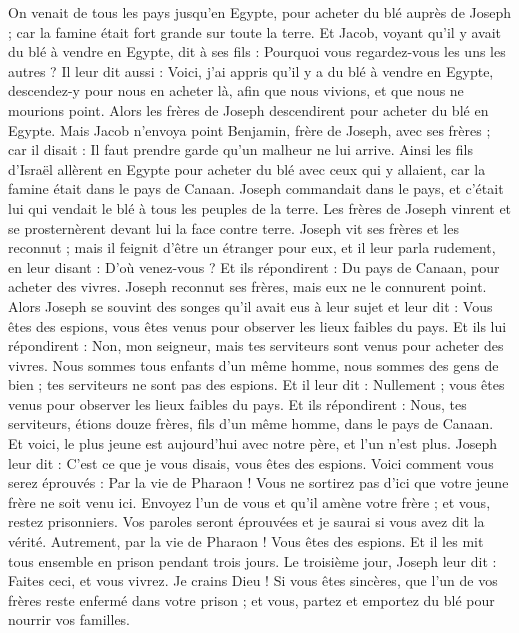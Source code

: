 \begin{multicols}{2}
On venait de tous les pays jusqu’en Egypte, pour acheter du blé  auprès de Joseph ; car la famine était fort grande sur toute la terre.
\VerseOne{}Et Jacob, voyant qu'il y avait du blé à vendre en Egypte, dit à ses fils : Pourquoi vous regardez-vous les uns les autres ?
Il leur dit aussi : Voici, j'ai appris qu'il y a du blé à vendre en Egypte, descendez-y pour nous en acheter là, afin que nous vivions, et que nous ne mourions point.
Alors les frères de Joseph descendirent pour acheter du blé en Egypte.
Mais Jacob n'envoya point Benjamin, frère de Joseph, avec ses frères ; car il disait : Il faut prendre garde qu’un malheur ne lui arrive.
Ainsi les fils d'Israël allèrent en Egypte pour acheter du blé avec ceux qui y allaient, car la famine était dans le pays de Canaan.
Joseph commandait dans le pays, et c’était lui qui vendait le blé à tous les peuples de la terre. Les frères de Joseph vinrent et se prosternèrent devant lui la face contre terre.
Joseph vit ses frères et les reconnut ; mais il feignit d’être un étranger pour eux, et il leur parla rudement, en leur disant : D'où venez-vous ? Et ils répondirent : Du pays de Canaan, pour acheter des vivres.
Joseph reconnut ses frères, mais eux ne le connurent point.
Alors Joseph se souvint des songes qu'il avait eus à leur sujet et leur dit : Vous êtes des espions, vous êtes venus pour observer les lieux faibles du pays.
Et ils lui répondirent : Non, mon seigneur, mais tes serviteurs sont venus pour acheter des vivres.
Nous sommes tous enfants d'un même homme, nous sommes des gens de bien ; tes serviteurs ne sont pas des espions.
Et il leur dit : Nullement ; vous êtes venus pour observer les lieux faibles du pays.
Et ils répondirent : Nous, tes serviteurs, étions douze frères, fils d'un même homme, dans le pays de Canaan. Et voici, le plus jeune est aujourd'hui avec notre père, et l'un n'est plus.
Joseph leur dit : C'est ce que je vous disais, vous êtes des espions.
Voici comment vous serez éprouvés : Par la vie de Pharaon ! Vous ne sortirez pas d'ici que votre jeune frère ne soit venu ici.
Envoyez l’un de vous et qu’il amène votre frère ; et  vous, restez prisonniers. Vos paroles seront éprouvées et je saurai si vous avez dit la vérité. Autrement, par la vie de Pharaon ! Vous êtes des espions.
Et il les mit tous ensemble en prison pendant trois jours.
Le troisième jour, Joseph leur dit : Faites ceci, et vous vivrez. Je crains Dieu !
Si vous êtes sincères, que l'un de vos frères reste enfermé dans votre prison ; et vous, partez et emportez du blé pour nourrir vos familles.

\end{multicols}
